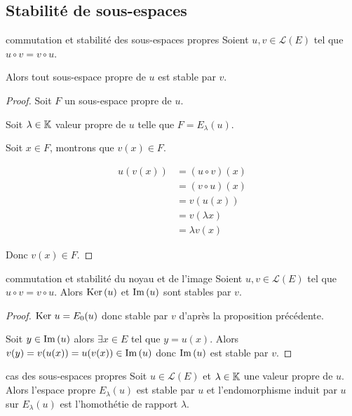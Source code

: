 \subsection{Stabilité de sous-espaces }

\begin{proposition}{commutation et stabilité des sous-espaces propres}{}
    Soient $u, v \in \mathscr L(E)$ tel que $u \circ v = v \circ u$.

    Alors tout sous-espace propre de $u$ est stable par $v$.
\end{proposition}

\begin{proof}
    Soit $F$ un sous-espace propre de $u$. 

    Soit $\lambda \in \mathbb{K}$ valeur propre de $u$ telle que $F = E_\lambda(u)$.

    Soit $x \in F$, montrons que $v(x) \in F$.

    \begin{align}
        u(v(x)) & = (u \circ v)(x) \\
                & = (v \circ u)(x) \\
                & = v(u(x)) \\
                & = v(\lambda x) \\
                & = \lambda v(x)
    \end{align}

    Donc $v(x) \in F$.
\end{proof}

\begin{proposition}{commutation et stabilité du noyau et de l'image}{}
    Soient $u, v \in \mathscr L(E)$ tel que $u \circ v = v \circ u$. Alors $\operatorname{Ker} \,(u)$ et
    $\operatorname{Im} \,(u)$ sont stables par $v$.
\end{proposition}

\begin{proof}
    $\operatorname{Ker} \, u = E_0(u)$ donc stable par $v$ d'après la proposition précédente.

    Soit $y \in \operatorname{Im} \,(u)$ alors $\exists x \in E$ tel que $y = u(x)$. Alors 
    $v(y) = v(u(x)) = u(v(x)) \in \operatorname{Im} \,(u)$ donc $\operatorname{Im} \,(u)$ est stable par $v$.
\end{proof}

\begin{proposition}{cas des sous-espaces propres}{}
    Soit $u \in \mathscr L(E)$ et $\lambda \in \mathbb{K}$ une valeur propre de $u$. 
    Alors l'espace propre $E_\lambda(u)$ est stable par $u$ et l'endomorphisme induit par $u$ 
    sur $E_\lambda(u)$ est l'homothétie de rapport $\lambda$.
\end{proposition}

